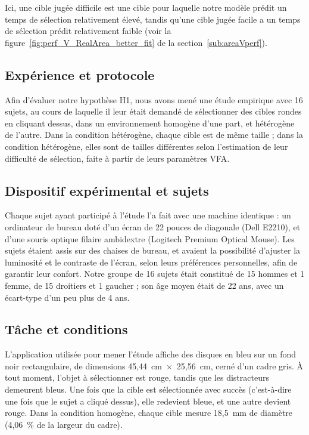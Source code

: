 	Ici, une cible \og jugée difficile \fg{} est une cible pour laquelle notre modèle prédit un temps de sélection relativement élevé, tandis qu'une cible \og jugée facile \fg{} a un temps de sélection prédit relativement faible (voir la figure~\ref{fig:perf_V_RealArea_better_fit} de la section~\ref{sub:areaVperf}).
	
	\subsection{Expérience et protocole}
	\label{sub:as_protocol}
	Afin d'évaluer notre hypothèse H1, nous avons mené une étude empirique avec 16 sujets, au cours de laquelle il leur était demandé de sélectionner des cibles rondes en cliquant dessus, dans un environnement homogène d'une part, et hétérogène de l'autre. Dans la condition hétérogène, chaque cible est de même taille ; dans la condition hétérogène, elles sont de tailles différentes selon l'estimation de leur difficulté de sélection, faite à partir de leurs paramètres VFA.
	
	\subsection{Dispositif expérimental et sujets}
	Chaque sujet ayant participé à l'étude l'a fait avec une machine identique : un ordinateur de bureau doté d'un écran de 22 pouces de diagonale (Dell E2210), et d'une souris optique filaire ambidextre (Logitech Premium Optical Mouse). Les sujets étaient assis sur des chaises de bureau, et avaient la possibilité d'ajuster la luminosité et le contraste de l'écran, selon leurs préférences personnelles, afin de garantir leur confort. Notre groupe de 16 sujets était constitué de 15 hommes et 1 femme, de 15 droitiers et 1 gaucher ; son âge moyen était de 22 ans, avec un écart-type d'un peu plus de 4 ans.
	
	\subsection{Tâche et conditions}
	L'application utilisée pour mener l'étude affiche des disques en bleu sur un fond noir rectangulaire, de dimensions 45,44~cm~$\times$~25,56~cm, cerné d'un cadre gris. À tout moment, l'objet à sélectionner est rouge, tandis que les distracteurs demeurent bleus. Une fois que la cible est sélectionnée avec succès (c'est-à-dire une fois que le sujet a cliqué dessus), elle redevient bleue, et une autre devient rouge. Dans la condition homogène, chaque cible mesure 18,5~mm de diamètre (4,06~\%{} de la largeur du cadre).
	
